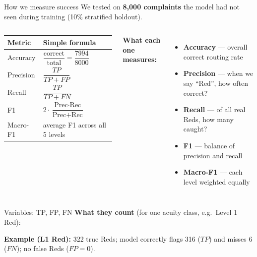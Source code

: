 \begin{frame}{How we measure success}
  \footnotesize
  We tested on \textbf{8,000 complaints} the model had not seen during training (10\% stratified holdout).

  \vspace{0.08cm}
  \begin{columns}[T]
    \begin{tabular}{@{}p{1.9cm} p{3.4cm}@{}}
      \toprule
      \textbf{Metric} & \textbf{Simple formula} \\
      \midrule
      Accuracy &
      $\dfrac{\text{correct}}{\text{total}} = \dfrac{7994}{8000}$ \\[3pt]
      Precision &
      $\dfrac{TP}{TP + FP}$ \\[3pt]
      Recall &
      $\dfrac{TP}{TP + FN}$ \\[3pt]
      F1 &
      $2 \cdot \dfrac{\text{Prec} \cdot \text{Rec}}{\text{Prec} + \text{Rec}}$ \\[3pt]
      Macro-F1 &
      average F1 across all 5 levels \\
      \bottomrule
    \end{tabular}

    \textbf{What each one measures:}
    \begin{itemize}\setlength{\itemsep}{2pt}
      \item \textbf{Accuracy} --- overall correct routing rate
      \item \textbf{Precision} --- when we say ``Red'', how often correct?
      \item \textbf{Recall} --- of all real Reds, how many caught?
      \item \textbf{F1} --- balance of precision and recall
      \item \textbf{Macro-F1} --- each level weighted equally
    \end{itemize}
  \end{columns}

\end{frame}

\begin{frame}{Variables: TP, FP, FN}
  \footnotesize
  \textbf{What they count} (for one acuity class, e.g.\ Level 1 Red):


  \vspace{0.15cm}
  \textbf{Example (L1 Red):} 322 true Reds; model correctly flags 316 ($TP$) and misses 6 ($FN$); no false Reds ($FP=0$).
\end{frame}

